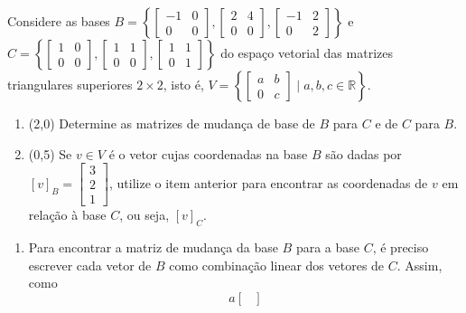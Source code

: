 \documentclass[12pt,a4paper]{article}
\newcommand*\R{\mathbb{R}}
\begin{document}
\begin{ExerciseList}

\Exercise[title={2,5}] Considere as bases $B = \left\{ \begin{bmatrix}
-1 & 0\\ 0 & 0
\end{bmatrix}, \begin{bmatrix}
 2 & 4\\ 0 & 0
\end{bmatrix}, \begin{bmatrix}
-1 & 2\\ 0 & 2
\end{bmatrix}\right\}$ e $C = \left\{ \begin{bmatrix}
1 & 0\\ 0 & 0
\end{bmatrix}, \begin{bmatrix}
1 & 1\\ 0 & 0
\end{bmatrix}, \begin{bmatrix}
1 & 1\\ 0 & 1
\end{bmatrix}\right\}$ do espaço vetorial das matrizes triangulares superiores $2 \times 2$, isto é, $V = \left\{ \begin{bmatrix}
a & b\\ 0 & c
\end{bmatrix} \mid a,b,c \in \R \right\}$.
\begin{enumerate}
\item (2,0) Determine as matrizes de mudança de base de $B$ para $C$ e de $C$ para $B$.
\item (0,5) Se $v \in V$ é o vetor cujas coordenadas na base $B$ são dadas por $[v]_B =
\begin{bmatrix}
3 \\
2 \\
1
\end{bmatrix}$, utilize o item anterior para encontrar as coordenadas de $v$ em relação à base $C$, ou seja, $[v]_C$.
\end{enumerate}
\Answer
\begin{enumerate}
\item
Para encontrar a matriz de mudança da base $B$ para a base $C$, é preciso escrever cada vetor de $B$ como combinação linear dos vetores de $C$. Assim, como
\[
a
\begin{bmatrix}

\end{bmatrix}\]
\end{enumerate}
\end{ExerciseList}
\end{document}
